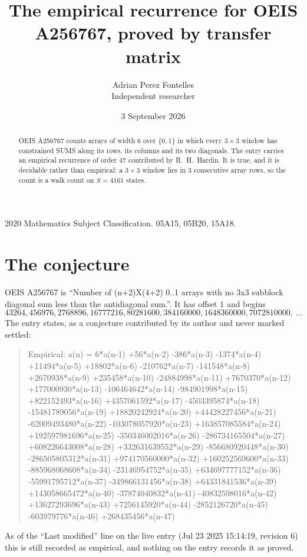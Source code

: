 \documentclass[11pt,a4paper]{article}
\title{The empirical recurrence for OEIS A256767, proved by transfer matrix}
\author{Adrian Perez Fontelles\\ \small Independent researcher}
\date{3 September 2026}
\theoremstyle{plain}
\theoremstyle{definition}
\begin{document}
\maketitle

\begin{abstract}
OEIS A256767 counts arrays of width $6$ over $\{0,1\}$ in which every $3\times3$ window has
constrained SUMS along its rows, its columns and its two diagonals. The entry carries an
empirical recurrence of order $47$ contributed by R.~H.~Hardin. It is true, and it is
decidable rather than empirical: a $3\times3$ window lies in $3$ consecutive array rows,
so the count is a walk count on $S=4161$ states.
\end{abstract}

\noindent\small 2020 Mathematics Subject Classification. 05A15, 05B20, 15A18.\normalsize

\section{The conjecture}

OEIS A256767 is ``Number of (n+2)X(4+2) 0..1 arrays with no 3x3 subblock diagonal sum less than the antidiagonal sum.''. It has offset $1$ and begins
\[
43264, 456976, 2768896, 16777216, 80281600, 384160000, 1648360000, 7072810000,\ \dots
\]
The entry states, as a conjecture contributed by its author and never marked settled:
\begin{quote}
Empirical: a(n) = 6*a(n-1) +56*a(n-2) -386*a(n-3) -1374*a(n-4) +11494*a(n-5) +18802*a(n-6) -210762*a(n-7) -141548*a(n-8) +2670938*a(n-9) +235458*a(n-10) -24884998*a(n-11) +7670370*a(n-12) +177000930*a(n-13) -106464642*a(n-14) -984901998*a(n-15) +822152493*a(n-16) +4357061592*a(n-17) -4503395874*a(n-18) -15481789056*a(n-19) +18820242924*a(n-20) +44428227456*a(n-21) -62009493480*a(n-22) -103078057920*a(n-23) +163857085584*a(n-24) +192597981696*a(n-25) -350346002016*a(n-26) -286734165504*a(n-27) +608226643008*a(n-28) +332631639552*a(n-29) -856680920448*a(n-30) -286505805312*a(n-31) +974170560000*a(n-32) +160252569600*a(n-33) -885968068608*a(n-34) -23146954752*a(n-35) +634697777152*a(n-36) -55991795712*a(n-37) -349866131456*a(n-38) +64331841536*a(n-39) +143058665472*a(n-40) -37874040832*a(n-41) -40832598016*a(n-42) +13627293696*a(n-43) +7256145920*a(n-44) -2852126720*a(n-45) -603979776*a(n-46) +268435456*a(n-47)
\end{quote}
As of the ``Last modified'' line on the live entry (Jul 23 2025 15:14:19, revision 6) this is still
recorded as empirical, and nothing on the entry records it as proved.
\end{document}
